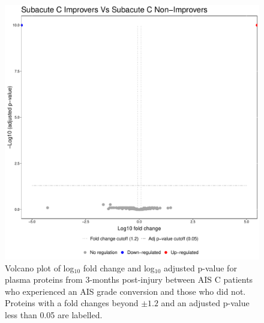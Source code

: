 \documentclass[9pt,lineno]{elife}
\begin{document}
\begin{landscape}
\begin{landscape}
\begin{landscape}
\begin{landscape}
\begin{figure}
\includegraphics[width=1\linewidth]{figures/openms_protein_quantification/label_free/volcano_plots/openms_volcano_plot_2021-08-10_0026} \caption{Volcano plot of log\(_10\) fold change and log\(_10\) adjusted p-value for plasma proteins from 3-months post-injury between AIS C patients who experienced an AIS grade conversion and those who did not. Proteins with a fold changes beyond \(\pm 1.2\) and an adjusted p-value less than 0.05 are labelled.}\label{fig:volc-plot-subacute-c-imp-vs-nonimp}
\end{figure}




\end{landscape}
\end{landscape}
\end{landscape}
\end{landscape}
\end{document}
